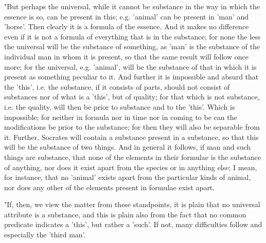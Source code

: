 "But perhaps the universal, while it cannot be substance in the way
in which the essence is so, can be present in this; e.g. 'animal'
can be present in 'man' and 'horse'. Then clearly it is a formula
of the essence. And it makes no difference even if it is not a formula
of everything that is in the substance; for none the less the universal
will be the substance of something, as 'man' is the substance of the
individual man in whom it is present, so that the same result will
follow once more; for the universal, e.g. 'animal', will be the substance
of that in which it is present as something peculiar to it. And further
it is impossible and absurd that the 'this', i.e. the substance, if
it consists of parts, should not consist of substances nor of what
is a 'this', but of quality; for that which is not substance, i.e.
the quality, will then be prior to substance and to the 'this'. Which
is impossible; for neither in formula nor in time nor in coming to
be can the modifications be prior to the substance; for then they
will also be separable from it. Further, Socrates will contain a substance
present in a substance, so that this will be the substance of two
things. And in general it follows, if man and such things are substance,
that none of the elements in their formulae is the substance of anything,
nor does it exist apart from the species or in anything else; I mean,
for instance, that no 'animal' exists apart from the particular kinds
of animal, nor does any other of the elements present in formulae
exist apart. 

"If, then, we view the matter from these standpoints, it is plain
that no universal attribute is a substance, and this is plain also
from the fact that no common predicate indicates a 'this', but rather
a 'such'. If not, many difficulties follow and especially the 'third
man'. 

